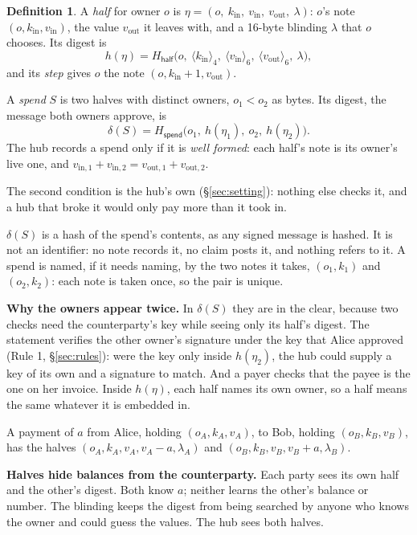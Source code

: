 \documentclass[11pt]{article}
\theoremstyle{plain}
\theoremstyle{definition}
\newtheorem{definition}{Definition}
\newcommand{\be}[2]{\langle #1\rangle_{#2}}
\newcommand{\Ht}[1]{H_{\textsf{#1}}}
\newcommand{\kin}{k_{\mathrm{in}}}
\newcommand{\vin}{v_{\mathrm{in}}}
\newcommand{\vout}{v_{\mathrm{out}}}
\begin{document}
\begin{definition}
A \emph{half} for owner $o$ is $\eta = (o,\ \kin,\ \vin,\ \vout,\
\lambda)$: $o$'s note $(o, \kin, \vin)$, the value $\vout$ it leaves
with, and a 16-byte blinding $\lambda$ that $o$ chooses. Its digest is
\[
  h(\eta) = \Ht{half}\big(o,\ \be{\kin}{4},\ \be{\vin}{6},\
  \be{\vout}{6},\ \lambda\big),
\]
and its \emph{step} gives $o$ the note $(o, \kin + 1, \vout)$.

A \emph{spend} $S$ is two halves with distinct owners, $o_1 < o_2$ as
bytes. Its digest, the message both owners approve, is
\[
  \delta(S) = \Ht{spend}\big(o_1,\ h(\eta_1),\ o_2,\ h(\eta_2)\big).
\]
The hub records a spend only if it is \emph{well formed}: each half's
note is its owner's live one, and $v_{\mathrm{in},1} + v_{\mathrm{in},2}
= v_{\mathrm{out},1} + v_{\mathrm{out},2}$.
\end{definition}

The second condition is the hub's own (\S\ref{sec:setting}): nothing
else checks it, and a hub that broke it would only pay more than it took
in.

$\delta(S)$ is a hash of the spend's contents, as any signed message is
hashed. It is not an identifier: no note records it, no claim posts it,
and nothing refers to it. A spend is named, if it needs naming, by the
two notes it takes, $(o_1, k_1)$ and $(o_2, k_2)$: each note is taken
once, so the pair is unique.

\textbf{Why the owners appear twice.} In $\delta(S)$ they are in the
clear, because two checks need the counterparty's key while seeing only
its half's digest. The statement verifies the other owner's signature
under the key that Alice approved (Rule 1, \S\ref{sec:rules}): were the
key only inside $h(\eta_2)$, the hub could supply a key of its own and a
signature to match. And a payer checks that the payee is the one on her
invoice. Inside $h(\eta)$, each half names its own owner, so a half
means the same whatever it is embedded in.

A payment of $a$ from Alice, holding $(o_A, k_A, v_A)$, to Bob, holding
$(o_B, k_B, v_B)$, has the halves $(o_A, k_A, v_A, v_A - a, \lambda_A)$
and $(o_B, k_B, v_B, v_B + a, \lambda_B)$.

\textbf{Halves hide balances from the counterparty.} Each party sees
its own half and the other's digest. Both know $a$; neither learns the
other's balance or number. The blinding keeps the digest from being
searched by anyone who knows the owner and could guess the values. The
hub sees both halves.
\end{document}
